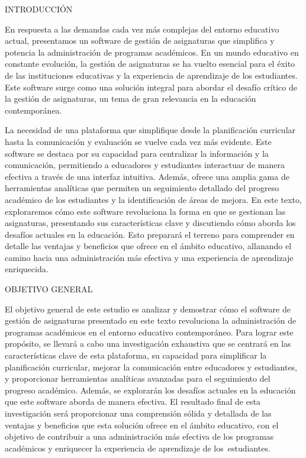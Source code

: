 INTRODUCCIÓN

En respuesta a las demandas cada vez más complejas del entorno educativo actual, presentamos un software de gestión de
asignaturas que simplifica y potencia la administración de programas académicos. En un mundo educativo en constante
evolución, la gestión de asignaturas se ha vuelto esencial para el éxito de las instituciones educativas y la experiencia
de aprendizaje de los estudiantes. Este software surge como una solución integral para abordar el desafío crítico de la 
gestión de asignaturas, un tema de gran relevancia en la educación contemporánea.

La necesidad de una plataforma que simplifique desde la planificación curricular hasta la comunicación y
evaluación se vuelve cada vez más evidente. Este software se destaca por su capacidad para centralizar la información
y la comunicación, permitiendo a educadores y estudiantes interactuar de manera efectiva a través de una interfaz
intuitiva. Además, ofrece una amplia gama de herramientas analíticas que permiten un seguimiento detallado del progreso
académico de los estudiantes y la identificación de áreas de mejora. En este texto, exploraremos cómo este
software revoluciona la forma en que se gestionan las asignaturas, presentando sus características clave y discutiendo
cómo aborda los desafíos actuales en la educación. Esto preparará el terreno para comprender en detalle las ventajas y
beneficios que ofrece en el ámbito educativo, allanando el camino hacia una administración más efectiva y una
experiencia de aprendizaje enriquecida.


OBJETIVO GENERAL


El objetivo general de este estudio es analizar y demostrar cómo el software de gestión de asignaturas presentado en este texto
revoluciona la administración de programas académicos en el entorno educativo contemporáneo. Para lograr este propósito, se llevará a
cabo una investigación exhaustiva que se centrará en las características clave de esta plataforma, su capacidad para simplificar la
planificación curricular, mejorar la comunicación entre educadores y estudiantes, y proporcionar herramientas analíticas avanzadas para
el seguimiento del progreso académico. Además, se explorarán los desafíos actuales en la educación que este software aborda de manera
efectiva. El resultado final de esta investigación será proporcionar una comprensión sólida y detallada de las ventajas y beneficios que
esta solución ofrece en el ámbito educativo, con el objetivo de contribuir a una administración más efectiva de los programas académicos
y enriquecer la experiencia de aprendizaje de los estudiantes.

